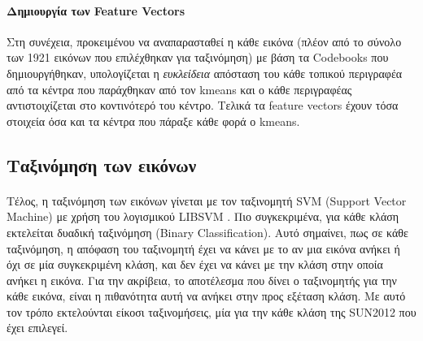 \paragraph*{Δημιουργία των Feature Vectors}
Στη συνέχεια, προκειμένου να αναπαρασταθεί η κάθε εικόνα (πλέον από το σύνολο των 1921 εικόνων που επιλέχθηκαν για ταξινόμηση) με βάση τα Codebooks που δημιουργήθηκαν, υπολογίζεται η \textit{ευκλείδεια} απόσταση του κάθε τοπικού περιγραφέα από τα κέντρα που παράχθηκαν από τον kmeans και ο κάθε περιγραφέας αντιστοιχίζεται στο κοντινότερό του κέντρο. Τελικά τα feature vectors έχουν τόσα στοιχεία όσα και τα κέντρα που πάραξε κάθε φορά ο kmeans.


\subsection{Ταξινόμηση των εικόνων}
\paragraph*{}
Τέλος, η ταξινόμηση των εικόνων γίνεται με τον ταξινομητή SVM (Support Vector Machine) με χρήση του λογισμικού LIBSVM \cite{libsvm}. Πιο συγκεκριμένα, για κάθε κλάση εκτελείται δυαδική ταξινόμηση (Binary Classification). Αυτό σημαίνει, πως σε κάθε ταξινόμηση, η απόφαση του ταξινομητή έχει να κάνει με το αν μια εικόνα ανήκει ή όχι σε μία συγκεκριμένη κλάση, και δεν έχει να κάνει με την κλάση στην οποία ανήκει η εικόνα. Για την ακρίβεια, το αποτέλεσμα που δίνει ο ταξινομητής για την κάθε εικόνα, είναι η πιθανότητα αυτή να ανήκει στην προς εξέταση κλάση. Με αυτό τον τρόπο εκτελούνται είκοσι ταξινομήσεις, μία για την κάθε κλάση της SUN2012 που έχει επιλεγεί.

